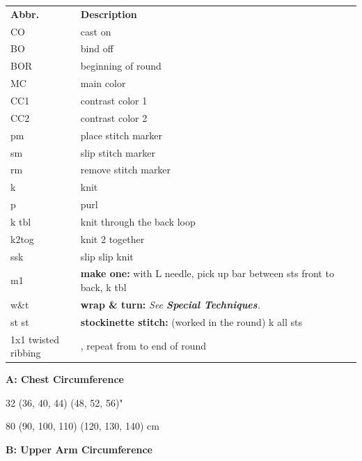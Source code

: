 \documentclass[12pt]{article}
\renewcommand{\arraystretch}{2} %
\renewcommand{\repeat}[1]{\textbf{\textasteriskcentered[#1]}, repeat from \textasteriskcentered \hspace{1pt}} %
\begin{document}
\begin{multicols}{2}
\vspace{-1em}
\begin{center}
{\renewcommand{\arraystretch}{1.2}
\begin{tabular}{| C{0.2\linewidth}  p{0.8\linewidth} | }
\thickhline {} 
\textbf{Abbr.}	& \textbf{Description} \\ \thickhline
CO	& cast on \\
BO 	& bind off \\
BOR 	& beginning of round \\
MC 	& main color \\
CC1 	& contrast color 1 \\
CC2 	& contrast color 2 \\
pm	& place stitch marker \\
sm	& slip stitch marker \\
rm 	& remove stitch marker \\
k	&  knit \\
p	& purl   \\
k tbl	& knit through the back loop \\
k2tog 	& knit 2 together \\
ssk	& slip slip knit \\
m1	& \textbf{make one:} with L needle, pick up bar between sts front to back, k tbl \\
w\&t 	& \textbf{wrap \& turn:} \emph{See \textbf{Special Techniques}.} \\
st st 	& \textbf{stockinette stitch:} (worked in the round) k all sts \\
1x1 twisted ribbing 	& \repeat{k tbl, p1} to end of round \\
\hline
\end{tabular}
}
\end{center}
{\begin{addmargin}[4em]{-2em} \small
{\normalsize\textbf{\textsf{A: Chest Circumference}}} 

\hspace{1em} 32 (36, 40, 44) (48, 52, 56)"

\hspace{1em} 80 (90, 100, 110) (120, 130, 140) cm 

{\normalsize\textbf{\textsf{B: Upper Arm Circumference}}}


\end{addmargin}}
\end{multicols}
\end{document}
